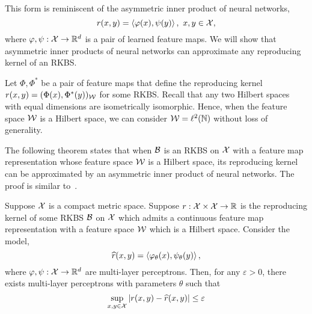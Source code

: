 This form is reminiscent of the asymmetric inner product of neural networks,
\begin{equation}
    r(x, y) = \iprod{\phi(x)}{\psi(y)}, \ x, y \in \calX,
\end{equation}
where $\varphi, \psi: {\mathcal{X}} \to \mathbb{R}^{d}$ is a pair of learned feature maps. We will show that asymmetric inner products of neural networks can approximate any reproducing kernel of an RKBS.

Let $\Phi, \Phi^*$ be a pair of feature maps that define the reproducing kernel $r(x,y) = (\Phi(x), \Phi^*(y))_{\mathcal{W}}$ for some RKBS. Recall that any two Hilbert spaces with equal dimensions are isometrically isomorphic. Hence, when the feature space ${\mathcal{W}}$ is a Hilbert space, we can consider ${\mathcal{W}} = \ell^2(\mathbb{N})$ without loss of generality. %

The following theorem states that when ${\mathcal{B}}$ is an RKBS on ${\mathcal{X}}$ with a feature map representation whose feature space ${\mathcal{W}}$ is a Hilbert space, its reproducing kernel can be approximated by an asymmetric inner product of neural networks. The proof is similar to~.

\begin{theorem}\label{thm:asymmetric_inner_prod_approximates_rkbs}
   Suppose ${\mathcal{X}}$ is a compact metric space. Suppose $r: {\mathcal{X}} \times {\mathcal{X}} \to \mathbb{R}$ is the reproducing kernel of some RKBS ${\mathcal{B}}$ on ${\mathcal{X}}$ which admits a continuous feature map representation with a feature space ${\mathcal{W}}$ which is a Hilbert space. Consider the model,
   \begin{equation}
    \hat{r}(x, y) = \iprod{\phi_\theta(x)}{\psi_\theta(y)},
   \end{equation}
    where $\varphi, \psi: {\mathcal{X}} \to \mathbb{R}^{d}$ are multi-layer perceptrons. Then, for any $\varepsilon > 0$, there exists multi-layer perceptrons with parameters $\theta$ such that
   \begin{equation*}
        \sup_{x,y \in \calX} \abs{r(x, y) - \hat{r}(x, y)} \leq \varepsilon
   \end{equation*}
\end{theorem}

